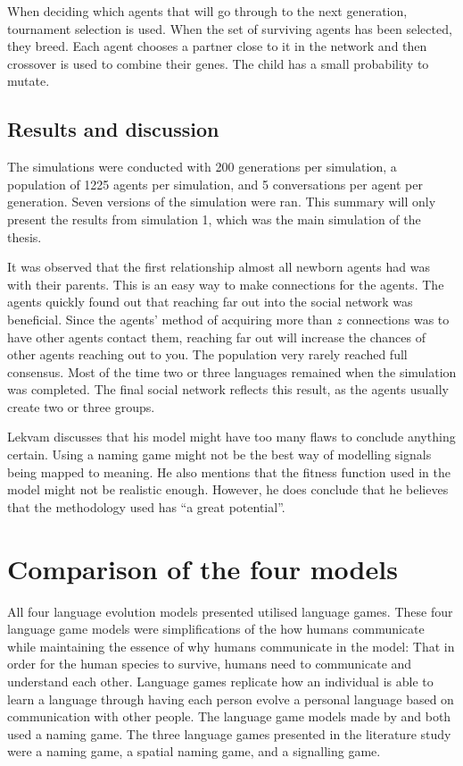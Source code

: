 When deciding which agents that will go through to the next generation, tournament selection is used. When the set of surviving agents has been selected, they breed. Each agent chooses a partner close to it in the network and then crossover is used to combine their genes. The child has a small probability to mutate. 

\subsection{Results and discussion}
The simulations were conducted with 200 generations per simulation, a population of 1225 agents per simulation, and 5 conversations per agent per generation. Seven versions of the simulation were ran. This summary will only present the results from simulation 1, which was the main simulation of the thesis. 

It was observed that the first relationship almost all newborn agents had was with their parents. This is an easy way to make connections for the agents. The agents quickly found out that reaching far out into the social network was beneficial. Since the agents' method of acquiring more than $z$ connections was to have other agents contact them, reaching far out will increase the chances of other agents reaching out to you. The population very rarely reached full consensus. Most of the time two or three languages remained when the simulation was completed. The final social network reflects this result, as the agents usually create two or three groups.

Lekvam discusses that his model might have too many flaws to conclude anything certain. Using a naming game might not be the best way of modelling signals being mapped to meaning. He also mentions that the fitness function used in the model might not be realistic enough. However, he does conclude that he believes that the methodology used has ``a great potential''.


\section{Comparison of the four models}
All four language evolution models presented utilised language games. These four language game models were simplifications of the how humans communicate while maintaining the essence of why humans communicate in the model: That in order for the human species to survive, humans need to communicate and understand each other. Language games replicate how an individual is able to learn a language through having each person evolve a personal language based on communication with other people. The language game models made by \citet{lipowska2011naming} and \citet{lekvam2014co} both used a naming game. The three language games presented in the literature study were a naming game, a spatial naming game, and a signalling game. 

